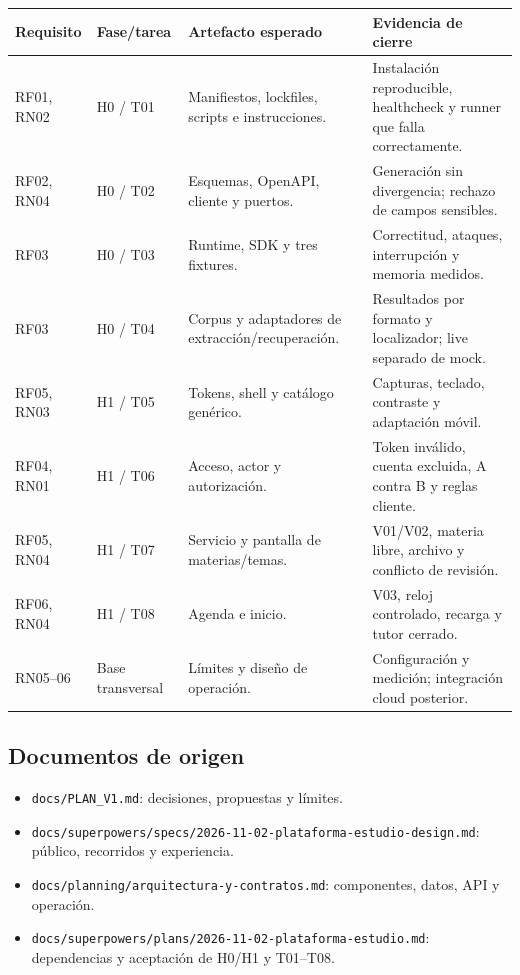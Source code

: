 \small
\begin{tabularx}{\linewidth}{P{1.7cm}P{2cm}Y Y}
\toprule
\textbf{Requisito} & \textbf{Fase/tarea} & \textbf{Artefacto esperado} & \textbf{Evidencia de cierre}\\
\midrule
RF01, RN02 & H0 / T01 & Manifiestos, lockfiles, scripts e instrucciones. & Instalación reproducible, healthcheck y runner que falla correctamente.\\
RF02, RN04 & H0 / T02 & Esquemas, OpenAPI, cliente y puertos. & Generación sin divergencia; rechazo de campos sensibles.\\
RF03 & H0 / T03 & Runtime, SDK y tres fixtures. & Correctitud, ataques, interrupción y memoria medidos.\\
RF03 & H0 / T04 & Corpus y adaptadores de extracción/recuperación. & Resultados por formato y localizador; live separado de mock.\\
RF05, RN03 & H1 / T05 & Tokens, shell y catálogo genérico. & Capturas, teclado, contraste y adaptación móvil.\\
RF04, RN01 & H1 / T06 & Acceso, actor y autorización. & Token inválido, cuenta excluida, A contra B y reglas cliente.\\
RF05, RN04 & H1 / T07 & Servicio y pantalla de materias/temas. & V01/V02, materia libre, archivo y conflicto de revisión.\\
RF06, RN04 & H1 / T08 & Agenda e inicio. & V03, reloj controlado, recarga y tutor cerrado.\\
RN05--06 & Base transversal & Límites y diseño de operación. & Configuración y medición; integración cloud posterior.\\
\bottomrule
\end{tabularx}
\normalsize
\subsection*{Documentos de origen}
\begin{itemize}
\item \nolinkurl{docs/PLAN_V1.md}: decisiones, propuestas y límites.
\item \nolinkurl{docs/superpowers/specs/2026-11-02-plataforma-estudio-design.md}: público, recorridos y experiencia.
\item \nolinkurl{docs/planning/arquitectura-y-contratos.md}: componentes, datos, API y operación.
\item \nolinkurl{docs/superpowers/plans/2026-11-02-plataforma-estudio.md}: dependencias y aceptación de H0/H1 y T01--T08.
\end{itemize}

